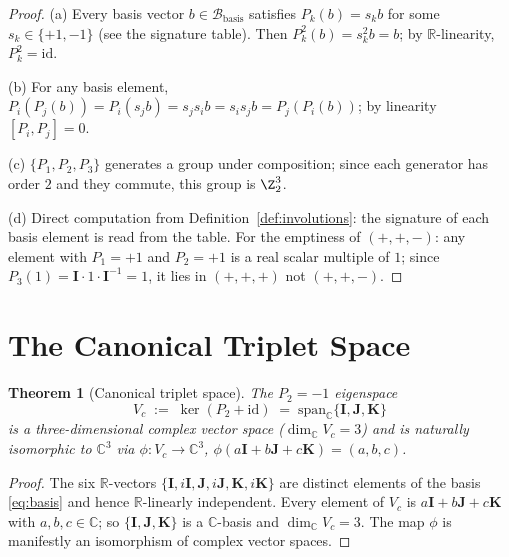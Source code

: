 \documentclass[12pt,a4paper]{article}
\newtheorem{theorem}{Theorem}[section]
\theoremstyle{remark}
\newcommand{\C}{\mathbb{C}}
\newcommand{\R}{\mathbb{R}}
\begin{document}
\begin{proof}
  (a) Every basis vector $b\in\mathcal{B}_\mathrm{basis}$ satisfies
  $P_k(b) = s_k b$ for some $s_k\in\{+1,-1\}$ (see the signature table).
  Then $P_k^2(b) = s_k^2 b = b$; by $\R$-linearity, $P_k^2=\mathrm{id}$.

  (b) For any basis element, $P_i(P_j(b)) = P_i(s_j b) = s_j s_i b
  = s_i s_j b = P_j(P_i(b))$; by linearity $[P_i,P_j]=0$.

  (c) $\{P_1,P_2,P_3\}$ generates a group under composition; since each
  generator has order $2$ and they commute, this group is $\Z_2^3$.

  (d) Direct computation from Definition~\ref{def:involutions}: the
  signature of each basis element is read from the table.  For the emptiness
  of $(+,+,-)$: any element with $P_1=+1$ and $P_2=+1$ is a real scalar
  multiple of $1$; since $P_3(1)=\mathbf{I}\cdot 1\cdot\mathbf{I}^{-1}=1$,
  it lies in $(+,+,+)$ not $(+,+,-)$.
\end{proof}

\section{The Canonical Triplet Space}
\label{sec:triplet}

\begin{theorem}[Canonical triplet space]
  \label{thm:triplet_space}
  The $P_2=-1$ eigenspace
  \begin{equation}
    \label{eq:Vc}
    V_c \;:=\; \ker(P_2+\mathrm{id})
       \;=\; \mathrm{span}_\C\{\mathbf{I},\mathbf{J},\mathbf{K}\}
  \end{equation}
  is a three-dimensional complex vector space ($\dim_\C V_c = 3$) and is
  naturally isomorphic to $\C^3$ via
  $\phi: V_c\to\C^3$, $\phi(a\mathbf{I}+b\mathbf{J}+c\mathbf{K}) = (a,b,c)$.
\end{theorem}

\begin{proof}
  The six $\R$-vectors $\{\mathbf{I},i\mathbf{I},\mathbf{J},i\mathbf{J},
  \mathbf{K},i\mathbf{K}\}$ are distinct elements of the basis
  \eqref{eq:basis} and hence $\R$-linearly independent.  Every element of
  $V_c$ is $a\mathbf{I}+b\mathbf{J}+c\mathbf{K}$ with $a,b,c\in\C$;
  so $\{\mathbf{I},\mathbf{J},\mathbf{K}\}$ is a $\C$-basis and
  $\dim_\C V_c = 3$.  The map $\phi$ is manifestly an isomorphism of
  complex vector spaces.
\end{proof}
\end{document}
